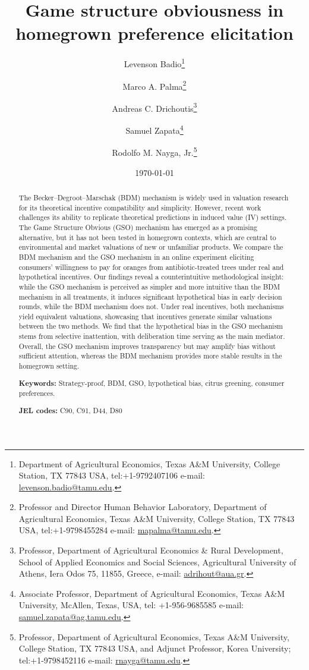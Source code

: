 \documentclass[12pt]{article}
\title{\textbf{Game structure obviousness in homegrown preference elicitation}}
\author[1]{Levenson Badio\thanks{Department of Agricultural Economics, Texas A\&M University, College Station, TX  77843 USA, tel:+1-9792407106 e-mail: \href{mailto:levenson.badio@tamu.edu}{levenson.badio@tamu.edu}.}}
\author[1]{Marco A. Palma\thanks{Professor and Director Human Behavior Laboratory, Department of Agricultural Economics, Texas A\&M University, College Station, TX  77843 USA, tel:+1-9798455284 e-mail: \href{mailto:mapalma@tamu.edu}{mapalma@tamu.edu}.}}
\author[2]{Andreas C. Drichoutis\thanks{Professor, Department of Agricultural Economics \& Rural Development, School of Applied Economics and Social Sciences, Agricultural University of Athens, Iera Odos 75, 11855, Greece, e-mail: \href{mailto:adrihout@aua.gr}{adrihout@aua.gr}.}}
\author[1]{Samuel Zapata\thanks{Associate Professor, Department of Agricultural Economics, Texas A\&M University, McAllen, Texas, USA, tel: +1-956-9685585 e-mail: \href{samuel.zapata@ag.tamu.edu}{samuel.zapata@ag.tamu.edu}.}}
\author[1]{Rodolfo M. Nayga, Jr.\thanks{Professor, Department of Agricultural Economics, Texas A\&M University, College Station, TX  77843 USA, and Adjunct Professor, Korea University; tel:+1-9798452116 e-mail: \href{mailto:rnayga@tamu.edu}{rnayga@tamu.edu}.}}
\affil[1]{Texas A\&M University}
\affil[2]{Agricultural University of Athens}
\date{\today}
\begin{document}
\maketitle
\onehalfspacing

\begin{abstract}
\noindent The Becker–Degroot–Marschak (BDM) mechanism is widely used in valuation research for its theoretical incentive compatibility and simplicity. However, recent work challenges its ability to replicate theoretical predictions in induced value (IV) settings. The Game Structure Obvious (GSO) mechanism has emerged as a promising alternative, but it has not been tested in homegrown contexts, which are central to environmental and market valuations of new or unfamiliar products.
We compare the BDM mechanism and the GSO mechanism in an online experiment eliciting consumers’ willingness to pay for oranges from antibiotic-treated trees under real and hypothetical incentives.
Our findings reveal a counterintuitive methodological insight: while the GSO mechanism is perceived as simpler and more intuitive than the BDM mechanism in all treatments, it induces significant hypothetical bias in early decision rounds, while the BDM mechanism does not. Under real incentives, both mechanisms yield equivalent valuations, showcasing that incentives generate similar valuations between the two methods. 
We find that the hypothetical bias in the GSO mechanism stems from selective inattention, with deliberation time serving as the main mediator. Overall, the GSO mechanism improves transparency but may amplify bias without sufficient attention, whereas the BDM mechanism provides more stable results in the homegrown setting.

\textbf{Keywords:} Strategy-proof, BDM, GSO, hypothetical bias, citrus greening, consumer preferences. 
	
\textbf{JEL codes:} C90, C91, D44, D80
 
 
 \end{abstract}


\onehalfspacing
\end{document}
